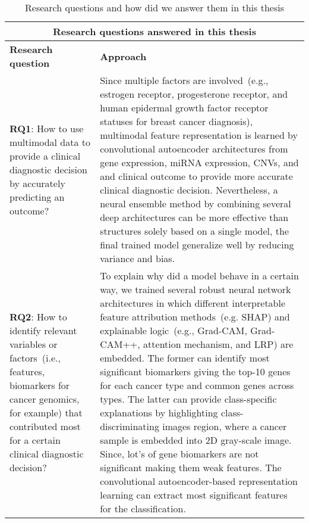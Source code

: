 \begin{table}[h!]
    \caption{Research questions and how did we answer them in this thesis}
    \label{table:rq_answers}
    \centering
    \vspace{-2mm}
    \scriptsize{
    \begin{tabular}{|p{4.8cm}|p{10cm}|}
         \hline
         \multicolumn{2}{|c|}{Research questions answered in this thesis} \\
         \hline
         \textbf{Research question} & \textbf{Approach} \\
         \hline
         \begin{flushleft} \textbf{RQ1}: How to use multimodal data to provide a clinical diagnostic decision by accurately predicting an outcome? \end{flushleft}& Since multiple factors are involved~(e.g., estrogen receptor, progesterone receptor, and human epidermal growth factor receptor statuses for breast cancer diagnosis), multimodal feature representation is learned by convolutional autoencoder architectures from gene expression, miRNA expression, CNVs, and and clinical outcome to provide more accurate clinical diagnostic decision. Nevertheless, a neural ensemble method by combining several deep architectures can be more effective than structures solely based on a single model, the final trained model generalize well by reducing variance and bias.\\ 
         \hline
         \begin{flushleft}\textbf{RQ2}: How to identify relevant variables or factors~(i.e., features, biomarkers for cancer genomics, for example) that contributed most for a certain clinical diagnostic decision?\end{flushleft} & To explain why did a model behave in a certain way, we trained several robust neural network architectures in which different interpretable feature attribution methods~(e.g. SHAP) and explainable logic~(e.g., Grad-CAM, Grad-CAM++, attention mechanism, and LRP) are embedded. The former can identify most significant biomarkers giving the top-10 genes for each cancer type and common genes across types. The latter can provide class-specific explanations by highlighting class-discriminating images region, where a cancer sample is embedded into 2D gray-scale image. Since, lot's of gene biomarkers are not significant making them weak features. The convolutional autoencoder-based representation learning can extract most significant features for the classification.\\ 

\end{tabular}}
\end{table}
